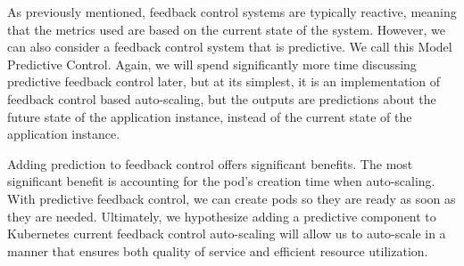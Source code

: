 As previously mentioned, feedback control systems are typically reactive,
meaning that the metrics used are based on the current state of the system.
However, we can also consider a feedback control system that is predictive. We
call this Model Predictive Control.\cite[pg.
27]{auto-scaling-techniques-for-elastic-applications-in-cloud-environments}
Again, we will spend significantly more time discussing predictive feedback
control later, but at its simplest, it is an implementation of feedback control
based auto-scaling, but the outputs are predictions about the future state of
the application instance, instead of the current state of the application instance.

Adding prediction to feedback control offers significant benefits. The most
significant benefit is accounting for the pod's creation time when auto-scaling.
With predictive feedback control, we can create pods so they are ready as soon
as they are needed. Ultimately, we hypothesize adding a predictive component to
Kubernetes current feedback control auto-scaling will allow us to auto-scale in
a manner that ensures both quality of service and efficient resource
utilization.

